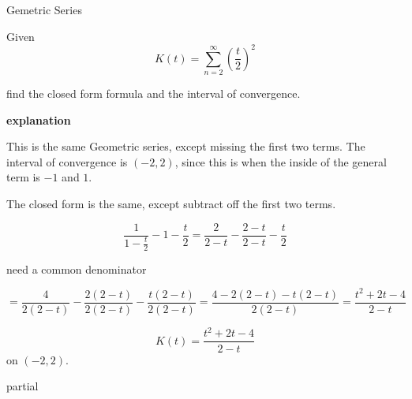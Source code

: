 \documentclass{ximera}
\begin{document}
\begin{example} Gemetric Series


Given 
\[    K(t) =   \sum_{n=2}^{\infty}  \left( \frac{t}{2} \right)^2    \]

find the closed form formula and the interval of convergence.




\textbf{\textcolor{purple!50!blue!90!black}{explanation}}


This is the same Geometric series, except missing the first two terms.  The interval of convergence is $(-2, 2)$, since this is when the inside of the general term is $-1$ and $1$.


The closed form is the same, except subtract off the first two terms.

\[  \frac{1}{1 - \frac{t}{2}}  - 1 - \frac{t}{2}    =     \frac{2}{2-t}  - \frac{2-t}{2-t} - \frac{t}{2}     \]


need a common denominator


\[=     \frac{4}{2(2-t)}  - \frac{2(2-t)}{2(2-t)} - \frac{t(2-t)}{2(2-t)} = \frac{4-2(2-t)-t(2-t)}{2(2-t)}  = \frac{t^2+2t-4}{2-t}   \]





\[    K(t) =   \frac{t^2+2t-4}{2-t}    \] on $(-2, 2)$.




\end{example}






















partial
\end{document}
